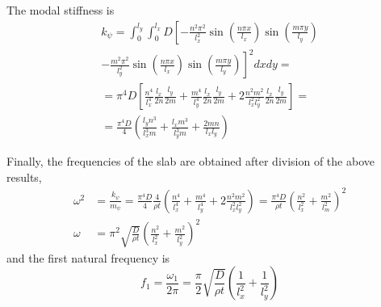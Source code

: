\documentclass{article}
\begin{document}
The modal stiffness is
\begin{multline*}
k_\psi =
\int_0^{l_y}\int_0^{l_x}D \left[-\frac{n^2\pi^2}{l_x^2} \sin\left(\frac{n\pi x}{l_x}\right) \sin\left(\frac{m\pi y}{l_y}\right)\right.\\
\left.-\frac{m^2\pi^2}{l_y^2} \sin\left(\frac{n\pi x}{l_x}\right) \sin\left(\frac{m\pi y}{l_y}\right) \right]^2 dxdy = \\
= \pi^4D \left[ \frac{n^4}{l_x^4}\frac{l_x}{2n}\frac{l_y}{2m} + \frac{m^4}{l_y^4}\frac{l_x}{2n}\frac{l_y}{2m}
+ 2\frac{n^2m^2}{l_x^2l_y^2}\frac{l_x}{2n}\frac{l_y}{2m} \right] = \\
= \frac{\pi^4D}{4}\left(\frac{l_yn^3}{l_x^3m} + \frac{l_xm^3}{l_y^3m} + \frac{2mn}{l_xl_y}\right)
\end{multline*}

Finally, the frequencies of the slab are obtained after division of the above results,
\begin{align*}
\omega^2 &= \frac{k_\psi}{m_\psi} = \frac{\pi^4D}{4}\frac{4}{\rho t}
\left(\frac{n^4}{l_x^4} + \frac{m^4}{l_y^4} + 2\frac{n^2m^2}{l_x^2l_y^2}\right)
= \frac{\pi^4D}{\rho t}\left(\frac{n^2}{l_x^2} + \frac{m^2}{l_m^2}\right)^2 \\
\omega &= \pi^2\sqrt{\frac{D}{\rho t}} \left(\frac{n^2}{l_x^2} + \frac{m^2}{l_y^2}\right)^2
\end{align*}
and the first natural frequency is
\begin{equation*}
f_1 = \frac{\omega_1}{2\pi} = \frac{\pi}{2}\sqrt{\frac{D}{\rho t}} \left(\frac{1}{l_x^2} + \frac{1}{l_y^2}\right)
\end{equation*}
\end{document}
